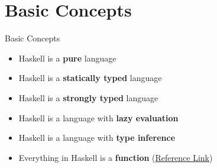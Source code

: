 \section{Basic Concepts}
\begin{frame}{Basic Concepts}
    \begin{itemize}
        \item Haskell is a \textbf{pure} language
        \item Haskell is a \textbf{statically typed} language
        \item Haskell is a \textbf{strongly typed} language
        \item Haskell is a language with \textbf{lazy evaluation}
        \item Haskell is a language with \textbf{type inference}
        \item Everything in Haskell is a \textbf{function} (\href{https://limited.systems/articles/everything-is-a-function/}{Reference Link})
    \end{itemize}
\end{frame}